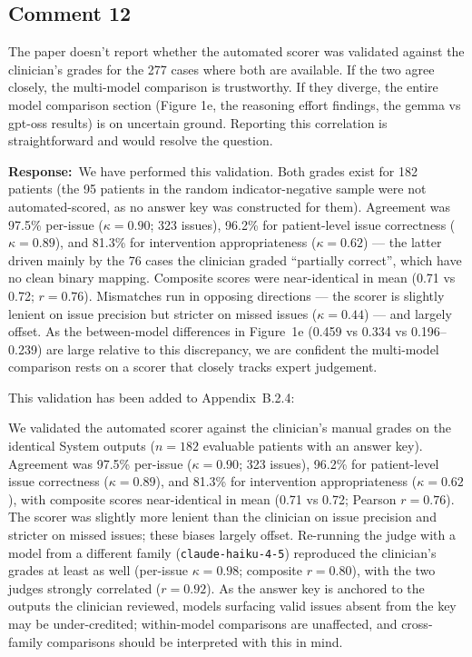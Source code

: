 \documentclass[11pt,a4paper]{article}
\newcounter{rcomment}
\newcommand{\response}{\noindent\textbf{Response:}\ }
\begin{document}
\subsection*{Comment 12}
\begin{reviewercomment}
The paper doesn't report whether the automated scorer was validated against the clinician's grades for the 277 cases where both are available. If the two agree closely, the multi-model comparison is trustworthy. If they diverge, the entire model comparison section (Figure 1e, the reasoning effort findings, the gemma vs gpt-oss results) is on uncertain ground. Reporting this correlation is straightforward and would resolve the question.
\end{reviewercomment}

\response We have performed this validation. Both grades exist for 182 patients (the 95 patients in the random indicator-negative sample were not automated-scored, as no answer key was constructed for them). Agreement was 97.5\% per-issue ($\kappa = 0.90$; 323 issues), 96.2\% for patient-level issue correctness ($\kappa = 0.89$), and 81.3\% for intervention appropriateness ($\kappa = 0.62$) --- the latter driven mainly by the 76 cases the clinician graded ``partially correct'', which have no clean binary mapping. Composite scores were near-identical in mean (0.71 vs 0.72; $r = 0.76$). Mismatches run in opposing directions --- the scorer is slightly lenient on issue precision but stricter on missed issues ($\kappa = 0.44$) --- and largely offset. As the between-model differences in Figure~1e (0.459 vs 0.334 vs 0.196--0.239) are large relative to this discrepancy, we are confident the multi-model comparison rests on a scorer that closely tracks expert judgement.

This validation has been added to Appendix~B.2.4:

\begin{manuscriptchange}
We validated the automated scorer against the clinician's manual grades on the identical System outputs ($n = 182$ evaluable patients with an answer key). Agreement was 97.5\% per-issue ($\kappa = 0.90$; 323 issues), 96.2\% for patient-level issue correctness ($\kappa = 0.89$), and 81.3\% for intervention appropriateness ($\kappa = 0.62$), with composite scores near-identical in mean (0.71 vs 0.72; Pearson $r = 0.76$). The scorer was slightly more lenient than the clinician on issue precision and stricter on missed issues; these biases largely offset. Re-running the judge with a model from a different family (\texttt{claude-haiku-4-5}) reproduced the clinician's grades at least as well (per-issue $\kappa = 0.98$; composite $r = 0.80$), with the two judges strongly correlated ($r = 0.92$). As the answer key is anchored to the outputs the clinician reviewed, models surfacing valid issues absent from the key may be under-credited; within-model comparisons are unaffected, and cross-family comparisons should be interpreted with this in mind.
\end{manuscriptchange}
\end{document}
